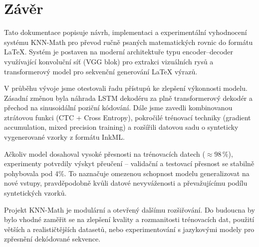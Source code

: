 \newpage
\section{Závěr}
Tato dokumentace popisuje návrh, implementaci a experimentální vyhodnocení systému KNN-Math pro převod ručně psaných matematických rovnic do formátu \LaTeX. Systém je postaven na moderní architektuře typu encoder–decoder využívající konvoluční síť (VGG blok) pro extrakci vizuálních rysů a transformerový model pro sekvenční generování LaTeX výrazů.

V průběhu vývoje jsme otestovali řadu přístupů ke zlepšení výkonnosti modelu. Zásadní změnou byla náhrada LSTM dekodéru za plně transformerový dekodér a přechod na sinusoidální poziční kódování. Dále jsme zavedli kombinovanou ztrátovou funkci (CTC + Cross Entropy), pokročilé trénovací techniky (gradient accumulation, mixed precision training) a rozšířili datovou sadu o synteticky vygenerované vzorky z formátu InkML.

Ačkoliv model dosahoval vysoké přesnosti na trénovacích datech ($\approx 98\,\%$),  experimenty potvrdily výskyt přeučení -- validační a testovací přesnost se stabilně pohybovala pod 4\%. To naznačuje omezenou schopnost modelu generalizovat na nové vstupy, pravděpodobně kvůli datové nevyváženosti a převažujícímu podílu syntetických vzorků.

Projekt KNN-Math je modulární a otevřený dalšímu rozšiřování. Do budoucna by bylo vhodné zaměřit se na zlepšení kvality a rozmanitosti trénovacích dat, použití větších a realističtějších datasetů, nebo experimentování s jazykovými modely pro zpřesnění dekódované sekvence.
~~
